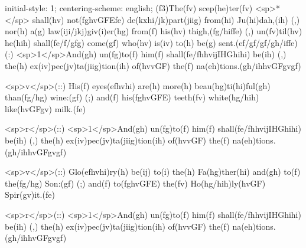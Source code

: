 initial-style: 1;
centering-scheme: english;
(f3)The(fv) scep(he)ter(fv) <sp>*</sp> shall(hv) not(fghvGFEfe) de(kxhi/jk)part(jiig) from(hi) Ju(hi)dah,(ih) (,) nor(h) a(g) law(iji/jkj)giv(i)er(hg) from(f) his(hv) thigh,(fg/hiffe) (,) un(fv)til(hv) he(hih) shall(fe/f/gfg) come(gf) who(hv) is(iv) to(h) be(g) sent.(ef/gf/gf/gh/iffe) (:) <sp>1</sp>And(gh) un(fg)to(f) him(f) shall(fe/fhhvijIHGhihi) be(ih) (,) the(h) ex(iv)pec(jv)ta(jiig)tion(ih) of(hvvGF) the(f) na(eh)tions.(gh/ihhvGFgvgf) 

<sp>v</sp>(::) His(f) eyes(efhvhi) are(h) more(h) beau(hg)ti(hi)ful(gh) than(fg/hg) wine:(gf) (;) and(f) his(fghvGFE) teeth(fv) white(hg/hih) like(hvGFgv) milk.(fe) 

<sp>r</sp>(::) <sp>1</sp>And(gh) un(fg)to(f) him(f) shall(fe/fhhvijIHGhihi) be(ih) (,) the(h) ex(iv)pec(jv)ta(jiig)tion(ih) of(hvvGF) the(f) na(eh)tions.(gh/ihhvGFgvgf) 

<sp>v</sp>(::) Glo(efhvhi)ry(h) be(ij) to(i) the(h) Fa(hg)ther(hi) and(gh) to(f) the(fg/hg) Son:(gf) (;) and(f) to(fghvGFE) the(fv) Ho(hg/hih)ly(hvGF) Spir(gv)it.(fe)

<sp>r</sp>(::) <sp>1</sp>And(gh) un(fg)to(f) him(f) shall(fe/fhhvijIHGhihi) be(ih) (,) the(h) ex(iv)pec(jv)ta(jiig)tion(ih) of(hvvGF) the(f) na(eh)tions.(gh/ihhvGFgvgf) 